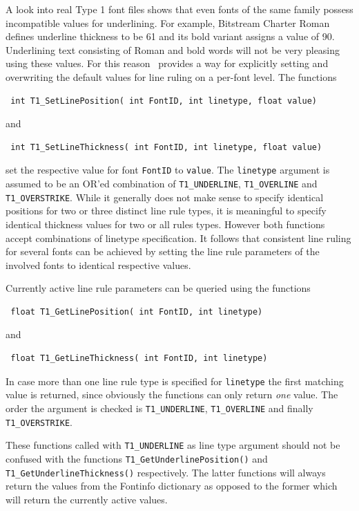 A look into real Type 1 font files shows that even fonts of the same family
possess incompatible values for underlining. For example, Bitstream Charter
Roman defines underline thickness to be 61 and its bold variant assigns a
value of 90. Underlining text consisting of Roman and bold words will not be
very pleasing using these values. For this reason \tonelib\ provides a way for
explicitly setting and overwriting the default values for line ruling on a
per-font level. The functions 
\precorr
\begin{verbatim}
 int T1_SetLinePosition( int FontID, int linetype, float value)
\end{verbatim}\postcorr
and
\precorr
\begin{verbatim}
 int T1_SetLineThickness( int FontID, int linetype, float value)
\end{verbatim}\postcorr
set the respective value for font \verb+FontID+ to \verb+value+.
The \verb+linetype+ argument is assumed to be an OR'ed combination of
\verb+T1_UNDERLINE+, \verb+T1_OVERLINE+ and \verb+T1_OVERSTRIKE+. While it
generally does not make sense to specify identical positions for two or three
distinct line rule types, it is meaningful to specify identical thickness
values for two or all rules types. However both functions accept combinations
of linetype specification.
It follows that consistent line ruling for several fonts can be achieved by
setting the line rule parameters of the involved fonts to identical respective
values.

Currently active line rule parameters can be queried using the functions
\precorr
\begin{verbatim}
 float T1_GetLinePosition( int FontID, int linetype)
\end{verbatim}\postcorr
and
\precorr
\begin{verbatim}
 float T1_GetLineThickness( int FontID, int linetype)
\end{verbatim}\postcorr
In case more than one line rule type is specified for
\verb+linetype+ the first matching value is returned, 
since obviously the functions can only return {\em one} value. The order the
argument is checked is \verb+T1_UNDERLINE+, \verb+T1_OVERLINE+ and
finally \verb+T1_OVERSTRIKE+. 

These functions called with \verb+T1_UNDERLINE+ as line type argument should
not be confused with the functions \verb+T1_GetUnderlinePosition()+ and
\verb+T1_GetUnderlineThickness()+ respectively. The latter functions will
always return the values from the Fontinfo dictionary as opposed to the former
which will return the currently active values. 

